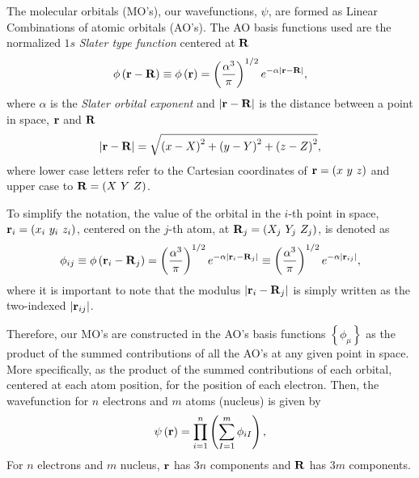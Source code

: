 The molecular orbitals (MO's), our wavefunctions, $\psi$, are formed as Linear
Combinations of atomic orbitals (AO's).
The AO basis functions used are the normalized $1s$ \textit{Slater type function} 
centered at $\boldsymbol{\mathrm{R}}$
\begin{equation}
    \phi \left( \boldsymbol{\mathrm{r}} - \boldsymbol{\mathrm{R}} \right) \equiv
    \phi \left( \boldsymbol{\mathrm{r}} \right) =
    \left( \frac{\alpha^3}{\pi} \right)^{1 /2}
    e^{-\alpha \left| \boldsymbol{\mathrm{r}} - \boldsymbol{\mathrm{R}} \right|}
    ,
\end{equation}
where $\alpha$ is the \textit{Slater orbital exponent} and 
$\left| \boldsymbol{\mathrm{r}} - \boldsymbol{\mathrm{R}} \right|$ is the distance between a point in space,
$ \boldsymbol{\mathrm{r}}$ and $ \boldsymbol{\mathrm{R}}$ 
\begin{equation} \label{eq:definition-mod-rR}
    \left| \boldsymbol{\mathrm{r}} - \boldsymbol{\mathrm{R}} \right|
    =
    \sqrt{\left( x - X \right)^{2} + \left( y - Y \right)^{2} + \left( z - Z \right)^{2}}
    ,
\end{equation}
where lower case letters refer to the Cartesian coordinates of 
$ \boldsymbol{\mathrm{r}} = \left( x\ y\ z \right)$ and upper case to 
$ \boldsymbol{\mathrm{R}} = \left( X\ Y\ Z \right)$.

To simplify the notation, the value of the orbital in the $i$-th point in space,
$\mat{r}_i = \left( x_i\ y_i\ z_i \right)$, centered on the $j$-th atom, at
$\boldsymbol{\mathrm{R}}_j = \left( X_j\ Y_j\ Z_j \right)$, is denoted as 
\begin{equation}
    \phi_{ij} \equiv
    \phi \left( \boldsymbol{\mathrm{r}}_i - \boldsymbol{\mathrm{R}}_j \right) =
    \left( \frac{\alpha^3}{\pi} \right)^{1 /2}
    e^{-\alpha \left| \boldsymbol{\mathrm{r}}_i - \boldsymbol{\mathrm{R}}_j \right|}
    \equiv
    \left( \frac{\alpha^3}{\pi} \right)^{1 /2}
    e^{-\alpha \left| \boldsymbol{\mathrm{r}}_{ij} \right|}
    ,
\end{equation}
where it is important to note that the modulus $\left| \boldsymbol{\mathrm{r}}_{i} - \boldsymbol{\mathrm{R}}_{j} \right|$
is simply written as the two-indexed $\left| \boldsymbol{\mathrm{r}}_{ij} \right|$.

Therefore, our MO's are constructed in the AO's basis functions $\left\{ \phi_{\mu} \right\}$
as the product of the summed contributions of all the AO's at any given point
in space. More specifically, as the product of the summed contributions of each
orbital, centered at each atom position, for the position of each electron.
Then, the wavefunction for $n$ electrons and $m$ atoms (nucleus) is given by 
\begin{equation} \label{eq:definition-psi}
    \psi \left( \boldsymbol{\mathrm{r}} \right) =
    \prod_{i=1}^{n} \left( \sum_{I=1}^{m} \phi_{iI} \right)
    ,
\end{equation}
For $n$ electrons and $m$ nucleus, $\boldsymbol{\mathrm{r}}$ has $3n$ components and
$\boldsymbol{\mathrm{R}}$ has $3m$ components.

